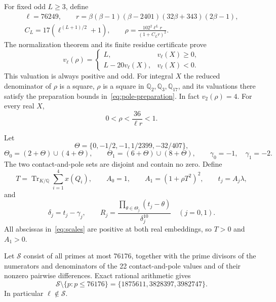 \documentclass[11pt,a4paper]{article}
\newcommand{\Q}{\mathbb Q}\newcommand{\Z}{\mathbb Z}
\DeclareMathOperator{\Tr}{Tr}
\begin{document}
For fixed odd $L\ge3$, define
\begin{equation}\label{eq:scalar-coefficient}
 \begin{gathered}
 \ell=76249,\qquad
 r=\beta(\beta-1)(\beta-2401)(32\beta+343)(2\beta-1),\\
 C_L=17(\ell^{(L+1)/2}+1),\qquad
 \rho=\frac{102^2\ell^L r}{(1+C_Lr)^2}.
 \end{gathered}
\end{equation}
The normalization theorem and its finite residue certificate
\cite{Normalizer} prove
\begin{equation}\label{eq:forced}
 v_\ell(\rho)=
 \begin{cases}L,&v_\ell(X)\ge0,\\L-20v_\ell(X),&v_\ell(X)<0.
 \end{cases}
\end{equation}
This valuation is always positive and odd. For integral $X$ the
reduced denominator of $\rho$ is a square, $\rho$ is a square in
$\Q_2,\Q_3,\Q_{17}$, and its valuations there satisfy the
preparation bounds in~\eqref{eq:pole-preparation}. In fact
$v_2(\rho)=4$. For every real $X$,
\begin{equation}\label{eq:rho-small}
 0<\rho<\frac{36}{\ell r}<1.
\end{equation}

Let
\[
 \Theta=\{0,-1/2,-1,1/2399,-32/407\},
\]
\[
 \Theta_0=(2+\Theta)\cup(4+\Theta),\qquad
 \Theta_1=(6+\Theta)\cup(8+\Theta),\qquad
 \gamma_0=-1,\quad\gamma_1=-2.
\]
The two contact-and-pole sets are disjoint and contain no zero.
Define
\begin{equation}\label{eq:scales}
 T=\Tr_{K/\Q}\sum_{i=1}^4x(Q_i),\qquad
 A_0=1,\qquad A_1=(1+\rho T^2)^2,
 \qquad t_j=A_j\lambda,
\end{equation}
and
\begin{equation}\label{eq:contacts}
 \delta_j=t_j-\gamma_j,\qquad
 R_j=\frac{\prod_{\theta\in\Theta_j}(t_j-\theta)}{\delta_j^{10}}
 \quad(j=0,1).
\end{equation}
All abscissas in~\eqref{eq:scales} are positive at both real
embeddings, so $T>0$ and $A_1>0$.

Let $\mathcal S$ consist of all primes at most $76176$, together
with the prime divisors of the numerators and denominators of the
22 contact-and-pole values and of their nonzero pairwise differences.
Exact rational arithmetic gives
\begin{equation}\label{eq:exceptional}
 \mathcal S\setminus\{p:p\le76176\}
 =\{1875611,3828397,3982747\}.
\end{equation}
In particular $\ell\notin\mathcal S$.
\end{document}

